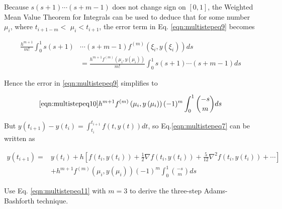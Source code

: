 Because $s(s+1) \cdots(s+m-1)$ does not change sign on $[0,1]$, the Weighted Mean Value Theorem for Integrals can be used to deduce that for some number $\mu_{i}$, where $t_{i+1-m}<$ $\mu_{i}<t_{i+1}$, the error term in Eq. \ref{eqn:multistepeq9} becomes

$$
\begin{aligned}
\frac{h^{m+1}}{m!} \int_{0}^{1} s(s+1) & \cdots(s+m-1) f^{(m)}\left(\xi_{i}, y\left(\xi_{i}\right)\right) d s \\
& =\frac{h^{m+1} f^{(m)}\left(\mu_{i}, y\left(\mu_{i}\right)\right)}{m!} \int_{0}^{1} s(s+1) \cdots(s+m-1) d s
\end{aligned}
$$

Hence the error in \ref{eqn:multistepeq9} simplifies to


\begin{equation}\ref{eqn:multistepeq10}
h^{m+1} f^{(m)}\left(\mu_{i}, y\left(\mu_{i}\right)\right)(-1)^{m} \int_{0}^{1}\binom{-s}{m} d s 
\end{equation}


But $y\left(t_{i+1}\right)-y\left(t_{i}\right)=\int_{t_{i}}^{t_{i+1}} f(t, y(t)) d t$, so Eq.\ref{eqn:multistepeq7} can be written as

\begin{equation}\label{eqn:multistepeq11}
\begin{split}
y\left(t_{i+1}\right)= & y\left(t_{i}\right)+h\left[f\left(t_{i}, y\left(t_{i}\right)\right)+\frac{1}{2} \nabla f\left(t_{i}, y\left(t_{i}\right)\right)+\frac{5}{12} \nabla^{2} f\left(t_{i}, y\left(t_{i}\right)\right)+\cdots\right] \\
& +h^{m+1} f^{(m)}\left(\mu_{i}, y\left(\mu_{i}\right)\right)(-1)^{m} \int_{0}^{1}\binom{-s}{m} d s 
\end{split}
\end{equation}


\begin{example}\label{exam:multistepexm2}
Use Eq. \ref{eqn:multistepeq11} with $m=3$ to derive the three-step Adams-Bashforth technique.
\end{example}

